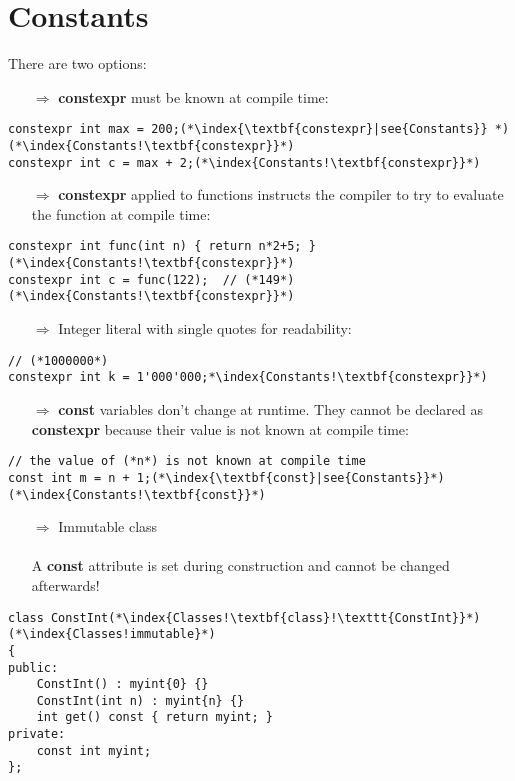 \documentclass[10pt]{article}
\begin{document}
\section{Constants}
\small
There are two options:
\begin{enumerate}
\item[$\Rightarrow$] \textbf{constexpr} must be known at compile time:
\end{enumerate}
\begin{lstlisting}
constexpr int max = 200;(*\index{\textbf{constexpr}|see{Constants}} *)(*\index{Constants!\textbf{constexpr}}*)
constexpr int c = max + 2;(*\index{Constants!\textbf{constexpr}}*)
\end{lstlisting}
\begin{enumerate}
\item[$\Rightarrow$] \textbf{constexpr} applied to functions instructs the compiler to try to evaluate the function at compile time:
\end{enumerate}
\begin{lstlisting}
constexpr int func(int n) { return n*2+5; }(*\index{Constants!\textbf{constexpr}}*)
constexpr int c = func(122);  // (*149*)(*\index{Constants!\textbf{constexpr}}*)
\end{lstlisting}
\begin{enumerate}
\item[$\Rightarrow$] Integer literal with single quotes for readability:
\end{enumerate}
\begin{lstlisting}
// (*1000000*)
constexpr int k = 1'000'000;*\index{Constants!\textbf{constexpr}}*)
\end{lstlisting}
\begin{enumerate}
\item[$\Rightarrow$] \textbf{const} variables don't change at runtime. They cannot be declared as
\textbf{constexpr} because their value is not known at compile time:
\end{enumerate}
\begin{lstlisting}
// the value of (*n*) is not known at compile time
const int m = n + 1;(*\index{\textbf{const}|see{Constants}}*)(*\index{Constants!\textbf{const}}*)
\end{lstlisting}
\begin{enumerate}
\item[$\Rightarrow$] Immutable class\\ \\ A \textbf{const} attribute is set during construction and cannot be changed afterwards!
\end{enumerate}
\begin{lstlisting}
class ConstInt(*\index{Classes!\textbf{class}!\texttt{ConstInt}}*)(*\index{Classes!immutable}*)
{
public:
    ConstInt() : myint{0} {}
    ConstInt(int n) : myint{n} {}
    int get() const { return myint; }
private:
    const int myint;
};
\end{lstlisting}
%
%
\end{document}
